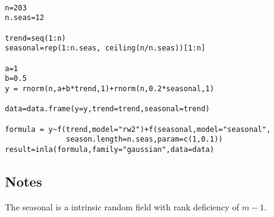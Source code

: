 \documentclass[a4paper,11pt]{article}
\begin{document}
\begin{verbatim}

n=203
n.seas=12

trend=seq(1:n)
seasonal=rep(1:n.seas, ceiling(n/n.seas))[1:n]

a=1
b=0.5
y = rnorm(n,a+b*trend,1)+rnorm(n,0.2*seasonal,1)

data=data.frame(y=y,trend=trend,seasonal=trend)

formula = y~f(trend,model="rw2")+f(seasonal,model="seasonal",
              season.length=n.seas,param=c(1,0.1))
result=inla(formula,family="gaussian",data=data)
\end{verbatim}


\subsection*{Notes}

The seasonal is a intrinsic random field with rank deficiency of $m-1$.
\end{document}
